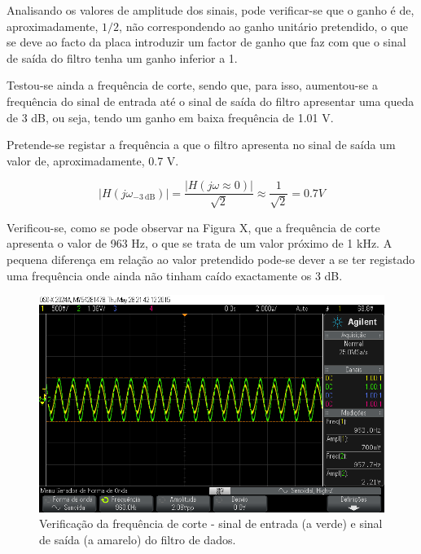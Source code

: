 \documentclass[11pt]{article}
\numberwithin{equation}{section}
\begin{document}
Analisando os valores de amplitude dos sinais, pode verificar-se que o ganho é de, aproximadamente, $1/2$, não correspondendo ao ganho unitário pretendido, o que se deve ao facto da placa introduzir um factor de ganho que faz com que o sinal de saída do filtro tenha um ganho inferior a 1. 

Testou-se ainda a frequência de corte, sendo que, para isso, aumentou-se a frequência do sinal de entrada até o sinal de saída do filtro apresentar uma queda de 3 dB, ou seja, tendo um ganho em baixa frequência de 1.01 V. 

Pretende-se registar a frequência a que o filtro apresenta no sinal de saída um valor de, aproximadamente, 0.7 V.

\vspace{-3mm}
\begin{equation}
	|H(j\omega_{-3~\text{dB}})| = \frac{|H(j\omega \approx 0)|}{\sqrt{2}} \approx \frac{1}{\sqrt{2}} = 0.7 V
\end{equation} 

\vspace{1mm}
Verificou-se, como se pode observar na Figura X, que a frequência de corte apresenta o valor de 963 Hz, o que se trata de um valor próximo de 1 kHz. A pequena diferença em relação ao valor pretendido pode-se dever a se ter registado uma frequência onde ainda não tinham caído exactamente os 3 dB.

\begin{figure}[H]
	\centering
	\includegraphics[keepaspectratio=true, scale=0.37]{exps/filtro_1k_freqcorte}
	\caption{Verificação da frequência de corte - sinal de entrada (a verde) e sinal de saída (a amarelo) do filtro de dados.}
	\vspace{-0.8em}
\end{figure} 
\end{document}
